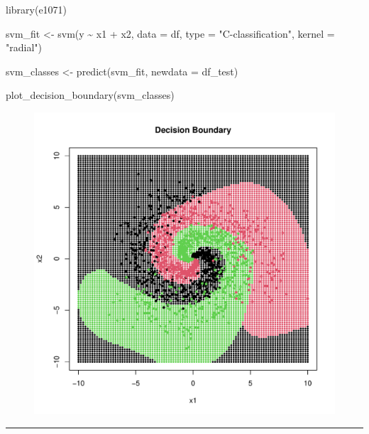 \documentclass[
  letterpaper,
  DIV=11,
  numbers=noendperiod]{scrartcl}
\newenvironment{Shaded}{\begin{snugshade}}{\end{snugshade}}
\newcommand{\AttributeTok}[1]{\textcolor[rgb]{0.40,0.45,0.13}{#1}}
\newcommand{\FunctionTok}[1]{\textcolor[rgb]{0.28,0.35,0.67}{#1}}
\newcommand{\NormalTok}[1]{\textcolor[rgb]{0.00,0.23,0.31}{#1}}
\newcommand{\OtherTok}[1]{\textcolor[rgb]{0.00,0.23,0.31}{#1}}
\newcommand{\SpecialCharTok}[1]{\textcolor[rgb]{0.37,0.37,0.37}{#1}}
\newcommand{\StringTok}[1]{\textcolor[rgb]{0.13,0.47,0.30}{#1}}
\begin{document}
\begin{Shaded}
\begin{Highlighting}[]
\FunctionTok{library}\NormalTok{(e1071)}

\NormalTok{svm\_fit }\OtherTok{\textless{}{-}} \FunctionTok{svm}\NormalTok{(y }\SpecialCharTok{\textasciitilde{}}\NormalTok{ x1 }\SpecialCharTok{+}\NormalTok{ x2, }\AttributeTok{data =}\NormalTok{ df, }\AttributeTok{type =} \StringTok{"C{-}classification"}\NormalTok{, }\AttributeTok{kernel =} \StringTok{"radial"}\NormalTok{)}

\NormalTok{svm\_classes }\OtherTok{\textless{}{-}} \FunctionTok{predict}\NormalTok{(svm\_fit, }\AttributeTok{newdata =}\NormalTok{ df\_test)}

\FunctionTok{plot\_decision\_boundary}\NormalTok{(svm\_classes)}
\end{Highlighting}
\end{Shaded}

\begin{figure}[H]

{\centering \includegraphics{hw5_files/figure-pdf/unnamed-chunk-29-1.pdf}

}

\end{figure}

\begin{center}\rule{0.5\linewidth}{0.5pt}\end{center}
\end{document}
